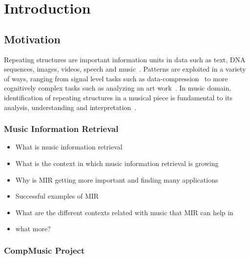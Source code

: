 
\chapter{Introduction}
\label{chap:intro}

\section{Motivation}
\label{sec:intro_motivation}

Repeating structures are important information units in data such as text, DNA sequences, images, videos, speech and music~\citep{Buhler2002b,Herley2006}. Patterns are exploited in a variety of ways, ranging from signal level tasks such as data-compression~\citep{Atallah1999} to more cognitively complex tasks such as analyzing an art work~\citep{van2010texton}. In music domain, identification of repeating structures in a musical piece is fundamental to its analysis, understanding and interpretation~\citep{Cook1987,Lerdahl1983}. 



\subsection{Music Information Retrieval}
\label{sec:intro_motivation_mir}

\begin{itemize}
	\item What is music information retrieval
	\item What is the context in which music information retrieval is growing
	\item Why is MIR getting more important and finding many applications
	\item Successful examples of MIR
	\item What are the different contexts related with music that MIR can help in
	\item what more?
\end{itemize}

\subsection{CompMusic Project}
\label{sec:intro_motivation_compmusic}

